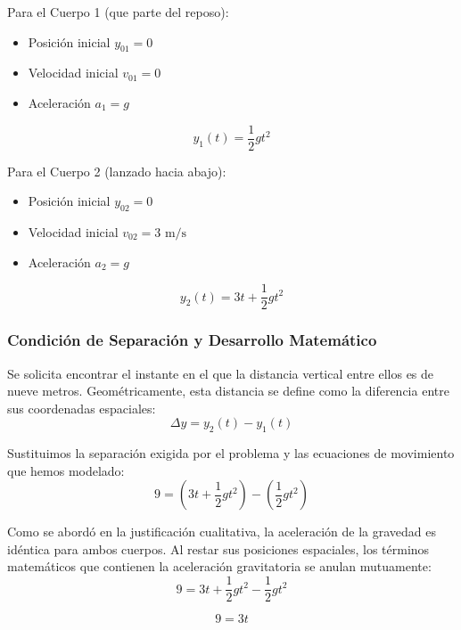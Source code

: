 \documentclass[12pt, a4paper]{article}
\begin{document}
Para el Cuerpo 1 (que parte del reposo):
\begin{itemize}
    \item Posición inicial $y_{01} = 0$
    \item Velocidad inicial $v_{01} = 0$
    \item Aceleración $a_1 = g$
\end{itemize}
\begin{equation}
y_1(t) = \frac{1}{2} g t^2
\end{equation}

Para el Cuerpo 2 (lanzado hacia abajo):
\begin{itemize}
    \item Posición inicial $y_{02} = 0$
    \item Velocidad inicial $v_{02} = 3 \text{ m/s}$
    \item Aceleración $a_2 = g$
\end{itemize}
\begin{equation}
y_2(t) = 3t + \frac{1}{2} g t^2
\end{equation}

\subsubsection*{Condición de Separación y Desarrollo Matemático}

Se solicita encontrar el instante en el que la distancia vertical entre ellos es de nueve metros. Geométricamente, esta distancia se define como la diferencia entre sus coordenadas espaciales:
\begin{equation}
\Delta y = y_2(t) - y_1(t)
\end{equation}

Sustituimos la separación exigida por el problema y las ecuaciones de movimiento que hemos modelado:
\begin{equation}
9 = \left( 3t + \frac{1}{2} g t^2 \right) - \left( \frac{1}{2} g t^2 \right)
\end{equation}

Como se abordó en la justificación cualitativa, la aceleración de la gravedad es idéntica para ambos cuerpos. Al restar sus posiciones espaciales, los términos matemáticos que contienen la aceleración gravitatoria se anulan mutuamente:
\begin{equation}
9 = 3t + \frac{1}{2} g t^2 - \frac{1}{2} g t^2
\end{equation}

\begin{equation}
9 = 3t
\end{equation}
\end{document}
